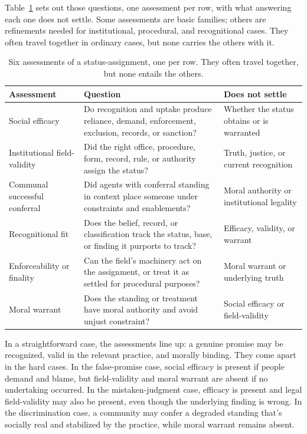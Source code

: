 \documentclass[12pt]{article}
\begin{document}
Table~\ref{tab:assessment} sets out those questions, one assessment per row, with what answering each one does not settle. Some assessments are basic families; others are refinements needed for institutional, procedural, and recognitional cases. They often travel together in ordinary cases, but none carries the others with it.

\begin{table}[H]
\centering
\small
\setlength{\tabcolsep}{3pt}
\begin{tabular}{@{}>{\raggedright\arraybackslash}p{}>{\raggedright\arraybackslash}p{}>{\raggedright\arraybackslash}p{}@{}}
\toprule
Assessment & Question & Does not settle \\
\midrule
Social efficacy & Do recognition and uptake produce reliance, demand, enforcement, exclusion, records, or sanction? & Whether the status obtains or is warranted \\
Institutional field-validity & Did the right office, procedure, form, record, rule, or authority assign the status? & Truth, justice, or current recognition \\
Communal successful conferral & Did agents with conferral standing in context place someone under constraints and enablements? & Moral authority or institutional legality \\
Recognitional fit & Does the belief, record, or classification track the status, base, or finding it purports to track? & Efficacy, validity, or warrant \\
Enforceability or finality & Can the field's machinery act on the assignment, or treat it as settled for procedural purposes? & Moral warrant or underlying truth \\
Moral warrant & Does the standing or treatment have moral authority and avoid unjust constraint? & Social efficacy or field-validity \\
\bottomrule
\end{tabular}
\caption{Six assessments of a status-assignment, one per row. They often travel together, but none entails the others.}
\label{tab:assessment}
\end{table}

In a straightforward case, the assessments line up: a genuine promise may be recognized, valid in the relevant practice, and morally binding. They come apart in the hard cases. In the false-promise case, social efficacy is present if people demand and blame, but field-validity and moral warrant are absent if no undertaking occurred. In the mistaken-judgment case, efficacy is present and legal field-validity may also be present, even though the underlying finding is wrong. In the discrimination case, a community may confer a degraded standing that's socially real and stabilized by the practice, while moral warrant remains absent.
\end{document}
